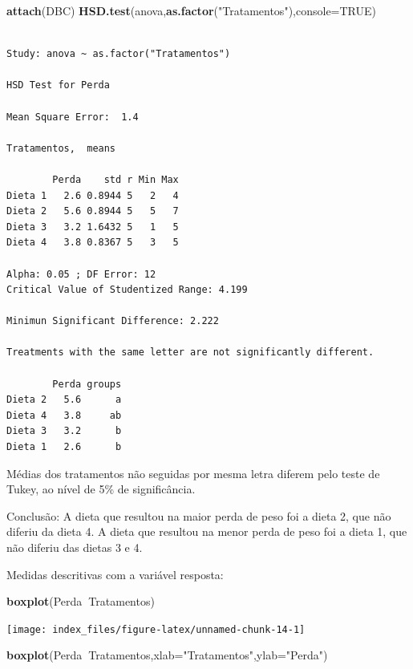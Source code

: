 \documentclass[12pt,brazil,oneside]{book}
\newenvironment{Shaded}{\begin{snugshade}}{\end{snugshade}}
\newcommand{\DataTypeTok}[1]{\textcolor[rgb]{0.13,0.29,0.53}{#1}}
\newcommand{\KeywordTok}[1]{\textcolor[rgb]{0.13,0.29,0.53}{\textbf{#1}}}
\newcommand{\NormalTok}[1]{#1}
\newcommand{\OperatorTok}[1]{\textcolor[rgb]{0.81,0.36,0.00}{\textbf{#1}}}
\newcommand{\OtherTok}[1]{\textcolor[rgb]{0.56,0.35,0.01}{#1}}
\newcommand{\StringTok}[1]{\textcolor[rgb]{0.31,0.60,0.02}{#1}}
\begin{document}
\begin{Shaded}
\begin{Highlighting}[]
\KeywordTok{attach}\NormalTok{(DBC)}
\KeywordTok{HSD.test}\NormalTok{(anova,}\KeywordTok{as.factor}\NormalTok{(}\StringTok{"Tratamentos"}\NormalTok{),}\DataTypeTok{console=}\OtherTok{TRUE}\NormalTok{)}
\end{Highlighting}
\end{Shaded}

\begin{verbatim}

Study: anova ~ as.factor("Tratamentos")

HSD Test for Perda 

Mean Square Error:  1.4 

Tratamentos,  means

        Perda    std r Min Max
Dieta 1   2.6 0.8944 5   2   4
Dieta 2   5.6 0.8944 5   5   7
Dieta 3   3.2 1.6432 5   1   5
Dieta 4   3.8 0.8367 5   3   5

Alpha: 0.05 ; DF Error: 12 
Critical Value of Studentized Range: 4.199 

Minimun Significant Difference: 2.222 

Treatments with the same letter are not significantly different.

        Perda groups
Dieta 2   5.6      a
Dieta 4   3.8     ab
Dieta 3   3.2      b
Dieta 1   2.6      b
\end{verbatim}

Médias dos tratamentos não seguidas por mesma letra diferem pelo teste de Tukey, ao nível de 5\% de significância.

Conclusão: A dieta que resultou na maior perda de peso foi a dieta 2, que não diferiu da dieta 4. A dieta que resultou na menor perda de peso foi a dieta 1, que não diferiu das dietas 3 e 4.

Medidas descritivas com a variável resposta:

\begin{Shaded}
\begin{Highlighting}[]
\KeywordTok{boxplot}\NormalTok{(Perda}\OperatorTok{~}\NormalTok{Tratamentos)}
\end{Highlighting}
\end{Shaded}

\begin{center}\texttt{[image: index\_files/figure-latex/unnamed-chunk-14-1]} \end{center}

\begin{Shaded}
\begin{Highlighting}[]
\KeywordTok{boxplot}\NormalTok{(Perda}\OperatorTok{~}\NormalTok{Tratamentos,}\DataTypeTok{xlab=}\StringTok{"Tratamentos"}\NormalTok{,}\DataTypeTok{ylab=}\StringTok{"Perda"}\NormalTok{)}
\end{Highlighting}
\end{Shaded}
\end{document}
